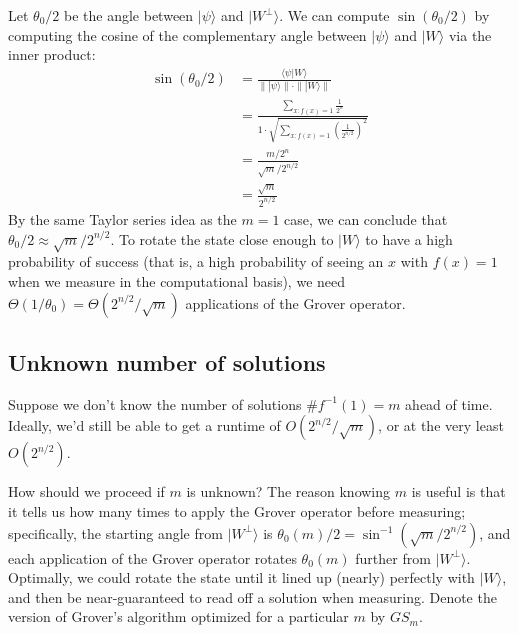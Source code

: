 \documentclass{article}
\newcommand{\ket}[1]{|#1\rangle}
\begin{document}
Let $\theta_0/2$ be the angle between $\ket{\psi}$ and $\ket{W^{\perp}}$. We can compute $\sin(\theta_0/2)$ by computing the cosine of the complementary angle between $\ket{\psi}$ and $\ket{W}$ via the inner product:
\begin{align*}
\sin(\theta_0/2) &= \frac{\langle \psi | W \rangle}{\|\ket{\psi}\| \cdot \|\ket{W}\|} \\
&= \frac{\sum_{x : f(x) = 1} \frac{1}{2^n}}{1 \cdot \sqrt{\sum_{x : f(x) = 1} \left(\frac{1}{2^{n/2}}\right)^2}} \\
&= \frac{m/2^n}{\sqrt{m}/2^{n/2}} \\
&= \frac{\sqrt{m}}{2^{n/2}}
\end{align*}
By the same Taylor series idea as the $m=1$ case, we can conclude that $\theta_0/2 \approx \sqrt{m}/2^{n/2}$. To rotate the state close enough to $\ket{W}$ to have a high probability of success (that is, a high probability of seeing an $x$ with $f(x)=1$ when we measure in the computational basis), we need $\Theta(1/\theta_0) = \Theta(2^{n/2} / \sqrt{m})$ applications of the Grover operator.

\subsection{Unknown number of solutions}

Suppose we don't know the number of solutions $\#f^{-1}(1) = m$ ahead of time. Ideally, we'd still be able to get a runtime of $O(2^{n/2}/\sqrt{m})$, or at the very least $O(2^{n/2})$.

How should we proceed if $m$ is unknown? The reason knowing $m$ is useful is that it tells us how many times to apply the Grover operator before measuring; specifically, the starting angle from $\ket{W^{\perp}}$ is $\theta_0(m)/2 = \sin^{-1}(\sqrt{m}/2^{n/2})$, and each application of the Grover operator rotates $\theta_0(m)$ further from $\ket{W^{\perp}}$. Optimally, we could rotate the state until it lined up (nearly) perfectly with $\ket{W}$, and then be near-guaranteed to read off a solution when measuring. Denote the version of Grover's algorithm optimized for a particular $m$ by $GS_m$.
\end{document}
